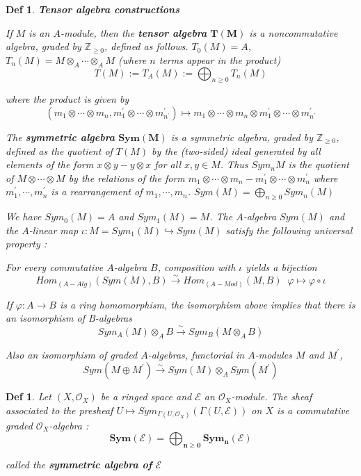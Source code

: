 \documentclass{article}
\newtheorem{definition}[theorem]{Def}
\begin{document}
\begin{definition}
    \textbf{Tensor algebra constructions}
    
If $M$ is an $A$-module, then the
\textbf{tensor algebra} $\bm{T(M)}$ is a noncommutative algebra, graded by $\mathbb Z_{\geq0}$, defined as
follows. $T_0(M) = A$, $T_n(M) = M \otimes_A \cdots \otimes_A M$ (where $n$ terms appear in the
product)
$$
T(M) := T_A(M) :=\bigoplus_{n\geq0}T_n(M)
$$

where the product is given by
$$(m_1 \otimes\cdots\otimes m_n, m_1^\prime \otimes\cdots\otimes m_{n^\prime}^\prime) \mapsto m_1 \otimes\cdots\otimes m_n \otimes m_1^\prime \otimes\cdots\otimes m_{n^\prime}^\prime$$

The \textbf{symmetric algebra} $\bm{Sym(M)}$ is a symmetric algebra, graded by $\mathbb Z_{\geq0}$, defined as the quotient of $T(M)$ by the (two-sided) ideal generated by all elements
of the form $x\otimes y-y\otimes x$ for all $x, y \in M$. Thus $Sym_n M$ is the quotient of $M\otimes\cdots\otimes M$
by the relations of the form $m_1 \otimes\cdots\otimes m_n - m_1^\prime \otimes\cdots\otimes m_n^\prime$ where $m_1^\prime, \cdots, m_n^\prime$
is a rearrangement of $m_1, \cdots, m_n$. 
$
Sym(M) =\bigoplus_{n\geq0}
Sym_n(M)
$

We have $Sym_0(M) = A$ and $Sym_1(M) = M$. The $A$-algebra $Sym(M)$ and the $A$-linear map $\iota: M = Sym_1(M) \hookrightarrow Sym(M)$ satisfy the following universal property :

For every
commutative $A$-algebra $B$, composition with $\iota$ yields a bijection
$$
Hom_{(A-Alg)}(Sym(M), B) \xrightarrow{\sim} Hom_{(A-Mod)}(M,B)\;\; \varphi \mapsto \varphi \circ \iota
$$

If $\varphi: A \to B$ is a ring homomorphism, the isomorphism above implies that there is an isomorphism
of B-algebras
$$
Sym_A(M) \otimes_A B \xrightarrow{\sim} Sym_B(M \otimes_A B)
$$

Also an isomorphism of graded $A$-algebras, functorial in $A$-modules $M$ and $M^\prime$,
$$Sym(M \oplus M^\prime) \xrightarrow{\sim} Sym(M) \otimes_A Sym(M^\prime)$$
\end{definition}

\begin{definition}
    Let $(X,\mathcal O_X)$ be a ringed space and $\mathcal E$ an $\mathcal O_X$-module. The sheaf associated
to the presheaf $U \mapsto Sym_{\Gamma(U,\mathcal O_X)}(\Gamma(U, \mathcal E ))$ on $X$ is a commutative graded $\mathcal O_X$-algebra :
$$
\bm{Sym(\mathcal E) =\bigoplus_{n\geq0}
Sym_n(\mathcal E)}
$$

called the \textbf{symmetric algebra of} $\bm{\mathcal E}$
\end{definition}
\end{document}
